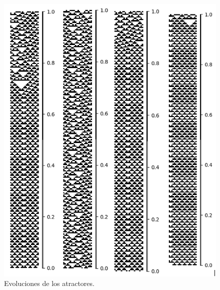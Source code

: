 \documentclass[11pt]{article}
\begin{document}
			\begin{figure}[H]
			\centering
			\includegraphics[scale=0.3]{resources/Atractores54/atractor_54_size_22_res.png}
			\caption{Evoluciones de los atractores.}\label{fig:picture}
			\end{figure}
\end{document}
